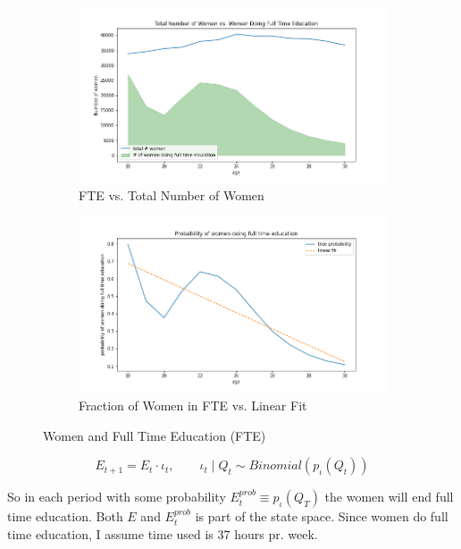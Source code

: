 \begin{figure}[ht]
\begin{subfigure}{.5\textwidth}
  \centering
  \includegraphics[width=1\linewidth]{figures/total_women_vs_education.png}
  \caption{FTE vs. Total Number of Women}
  \label{fig:educ_empirical}
\end{subfigure}%
\begin{subfigure}{.5\textwidth}
  \centering
  \includegraphics[width=1\linewidth]{figures/prop_women_doing_full_time_education.png}
  \caption{Fraction of Women in FTE vs. Linear Fit}
  \label{fig:prob_educ_full_time}
\end{subfigure}
    \caption{Women and Full Time Education (FTE)}
    \label{fig:educ_women}
\end{figure}

\begin{equation}
    E_{t+1} = E_{t} \cdot \iota_t, \qquad \iota_t \mid Q_t \sim  Binomial(p_{\iota}(Q_t))
\end{equation}

So in each period with some probability $E^{prob}_t \equiv p_{\iota}(Q_T)$ the women will end full time education. Both $E$ and $E^{prob}_t$ is part of the state space. Since women do full time education, I assume time used is 37 hours pr. week.

